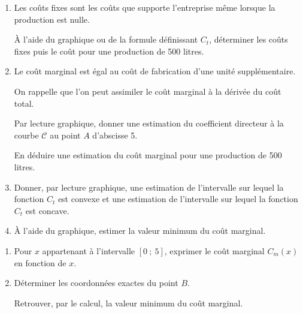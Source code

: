 \begin{center}
\end{center} 
\par
%
%
\par
\begin{enumerate}
     \item
     Les coûts fixes sont les coûts que supporte l'entreprise même lorsque la production est nulle.
     \par
     \`A l'aide du graphique ou de la formule définissant $C_t$, déterminer les coûts fixes puis le coût pour une production de 500 litres.
     \item
     Le coût marginal est égal au coût de fabrication d'une unité supplémentaire.
     \par
     On rappelle que l'on peut assimiler le coût marginal à la dérivée du coût total.
     \par
     Par lecture graphique, donner une estimation du coefficient directeur à la courbe $\mathscr{C}$ au point $A$ d'abscisse 5.
     \par
     En déduire une estimation du coût marginal pour une production de 500 litres.
     \item
     Donner, par lecture graphique, une estimation de l'intervalle sur lequel la fonction $C_t$ est convexe et une estimation de l'intervalle sur lequel la fonction $C_t$ est concave.
     \item
     \`A l'aide du graphique, estimer la valeur minimum du coût marginal.
     \par
\end{enumerate}
\par
%
%
\par
\begin{enumerate}
     \item
     Pour $x$ appartenant à l'intervalle $[0~;~5]$, exprimer le coût marginal $C_m(x)$ en fonction de $x$.
     \item
     Déterminer les coordonnées exactes du point $B$.
     \par
     Retrouver, par le calcul, la valeur minimum du coût marginal.
     \par
\end{enumerate}
